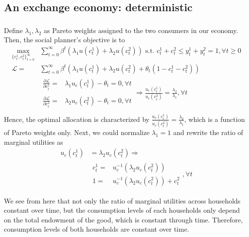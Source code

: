 \documentclass[]{article}
\begin{document}
\subsection{An exchange economy: deterministic}
\subsubsection{}\label{ex3.1}
Define $\lambda_1, \lambda_2$ as Pareto weights assigned to the two consumers in our economy. Then, the social planner's objective is to
\begin{equation}
	\begin{split}
		\max\limits_{\{c_t^1, c_t^2\}_{t = 0}^{\infty}}&\sum\limits_{t = 0}^{\infty}\beta^t(\lambda_1u(c_t^1) + \lambda_2u(c_t^2))\text{ s.t. }c_t^1 + c_t^2 \leq y_t^1 + y_t^2 = 1, \forall t\geq 0\\\nonumber
		\mathcal{L} = &\sum\limits_{t = 0}^{\infty}\beta^t(\lambda_1u(c_t^1) + \lambda_2u(c_t^2) + \theta_t(1 - c_t^1 - c_t^2))\\
		&\begin{matrix}
		\frac{\partial\mathcal{L}}{\partial c_t^1} = & \lambda_1u_c(c_t^1) - \theta_t = 0, \forall t\\ \\
		\frac{\partial\mathcal{L}}{\partial c_t^2} = & \lambda_2u_c(c_t^2) - \theta_t = 0, \forall t
		\end{matrix} \Longrightarrow \frac{u_c(c_t^1)}{u_c(c_t^2)} = \frac{\lambda_2}{\lambda_1}, \forall t\\
	\end{split}
\end{equation}
Hence, the optimal allocation is characterized by $\frac{u_c(c_t^1)}{u_c(c_t^2)} = \frac{\lambda_2}{\lambda_1}$, which is a function of Pareto weights only.
Next, we could normalize $\lambda_1 = 1$ and rewrite the ratio of marginal utilities as
\begin{equation}
	\begin{split}
		u_c(c_t^1)& = \lambda_2u_c(c_t^2) \Longrightarrow \\ \nonumber
		&\begin{matrix}
		c_t^1 =& u_c^{-1}(\lambda_2u_c(c_t^2)) \\
		1 =& u_c^{-1}(\lambda_2u_c(c_t^2)) + c_t^2
		\end{matrix}
		, \forall t
	\end{split}
\end{equation}

We see from here that not only the ratio of marginal utilities across households constant over time, but the consumption levels of each households only depend on the total endowment of the good, which is constant through time. Therefore, consumption levels of both households are constant over time.
\end{document}

